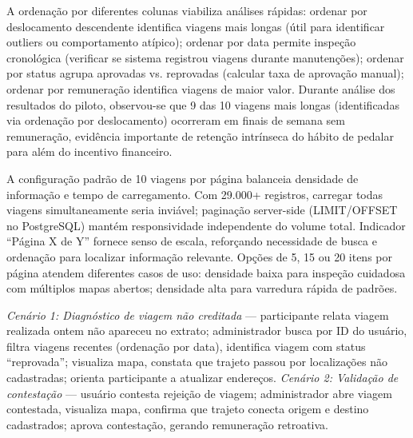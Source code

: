 A ordenação por diferentes colunas viabiliza análises rápidas: ordenar por deslocamento descendente identifica viagens mais longas (útil para identificar outliers ou comportamento atípico); ordenar por data permite inspeção cronológica (verificar se sistema registrou viagens durante manutenções); ordenar por status agrupa aprovadas vs. reprovadas (calcular taxa de aprovação manual); ordenar por remuneração identifica viagens de maior valor. Durante análise dos resultados do piloto, observou-se que 9 das 10 viagens mais longas (identificadas via ordenação por deslocamento) ocorreram em finais de semana sem remuneração, evidência importante de retenção intrínseca do hábito de pedalar para além do incentivo financeiro.

A configuração padrão de 10 viagens por página balanceia densidade de informação e tempo de carregamento. Com 29.000+ registros, carregar todas viagens simultaneamente seria inviável; paginação server-side (LIMIT/OFFSET no PostgreSQL) mantém responsividade independente do volume total. Indicador ``Página X de Y'' fornece senso de escala, reforçando necessidade de busca e ordenação para localizar informação relevante. Opções de 5, 15 ou 20 itens por página atendem diferentes casos de uso: densidade baixa para inspeção cuidadosa com múltiplos mapas abertos; densidade alta para varredura rápida de padrões.

\textit{Cenário 1: Diagnóstico de viagem não creditada} --- participante relata viagem realizada ontem não apareceu no extrato; administrador busca por ID do usuário, filtra viagens recentes (ordenação por data), identifica viagem com status ``reprovada''; visualiza mapa, constata que trajeto passou por localizações não cadastradas; orienta participante a atualizar endereços. \textit{Cenário 2: Validação de contestação} --- usuário contesta rejeição de viagem; administrador abre viagem contestada, visualiza mapa, confirma que trajeto conecta origem e destino cadastrados; aprova contestação, gerando remuneração retroativa.


